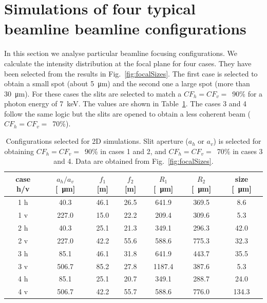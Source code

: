 \documentclass{iucr}              %
\begin{document}
\section{Simulations of four typical beamline beamline configurations}
\label{sec:complete-beamline}

In this section we analyse particular beamline focusing configurations. We calculate the intensity distribution at the focal plane for four cases. They have been selected from the results in Fig.~\ref{fig:focalSizes}. The first case is selected to obtain a small spot (about \SI{5}{\micro\meter}) and the second one a large spot (more than \SI{30}{\micro\meter}).  For these cases the slits are selected to match a $CF_h=CF_v=$~90\% for a photon energy of \SI{7}{keV}. The values are shown in Table~\ref{table:2Dusercases}. The cases 3 and 4 follow the same logic but the slits are opened to obtain a less coherent beam ($CF_h=CF_v=$~70\%). 


\begin{table}[]
    \label{table:2Dusercases}
    \caption{Configurations selected for 2D simulations. Slit aperture ($a_h$ or $a_v$) is selected for obtaining $CF_h=CF_v=$~90\% in cases 1 and 2, and $CF_h=CF_v=$~70\% in cases 3 and 4. Data are obtained from Fig.~\ref{fig:focalSizes}.
    }
    \begin{tabular}{c|c|c|c|c|c|c}
         case h/v & $a_h/a_v$ [\SI{}{\micro\meter}] & $f_1$ [m] & $f_2$ [m] & $R_1$ [\SI{}{\micro\meter}]& $R_2$ [\SI{}{\micro\meter}] & size [\SI{}{\micro\meter}]\\
         \hline
1 h &      40.3 & 46.1 &     26.5 &     641.9 &     369.5 &     8.6 
\\
1 v &      227.0 & 15.0 &     22.2 &     209.4 &     309.6 &     5.3 
\\
\hline
2 h &      40.3 & 25.1 &     21.3 &     349.1 &     296.3 &     42.0  
\\
2 v &      227.0 & 42.2 &     55.6 &     588.6 &     775.3 &     32.3 
\\
\hline \hline
3 h &      85.1 & 46.1 &     31.8 &     641.9 &     443.7 &     35.5 
\\
3 v &      506.7 & 85.2 &     27.8 &     1187.4 &     387.6  &     5.3 
\\
\hline
4 h &      85.1 & 25.1 &     20.7 &     349.1 &     288.7 &     24.0 
\\
4 v &      506.7 & 42.2 &     55.7 &     588.6 &     776.0 &     134.3 

    \end{tabular}
\end{table}
\end{document}
